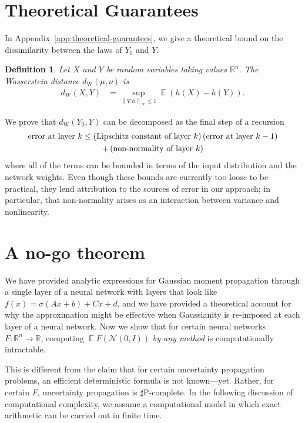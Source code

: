 \documentclass{article}
\newtheorem{definition}{Definition}
\DeclareMathOperator{\expect}{\mathbb{E}}
\begin{document}
\section{Theoretical Guarantees}
In Appendix~\ref{app:theoretical-guarantees}, we give a theoretical bound on the dissimilarity between the laws of \(Y_0\) and \(Y\).

\begin{definition}
Let \(X\) and \(Y\) be random variables taking values  \(\mathbb{R}^n\).
The Wasserstein distance \(d_\text{W} (\mu, \nu)\) is 
\begin{align*}
  d_\mathrm{W}(X, Y) &= \sup_{\left\|\nabla h\right\|_{\infty} \leq 1} \expect (h(X) - h(Y)).
\end{align*}
\end{definition}

We prove that \(d_\mathrm{W}(Y_0, Y)\) can be decomposed as
the final step of a recursion
\begin{multline}
  \text{error at layer \(k\)}
  \leq \del{\text{Lipschitz constant of layer \(k\)}} \del{\text{error at layer \(k-1\)}}
  \\
  + \del{\text{non-normality of layer \(k\)}}
\end{multline}
where all of the terms can be bounded in terms of the input distribution and the network weights.
Even though these bounds are currently too loose to be practical, they lend attribution to the sources of error in our approach; in particular, that non-normality arises as an interaction between variance and nonlinearity.

\section{A no-go theorem}
We have provided analytic expressions for Gaussian moment propagation through a single layer of a neural network with layers that look like \(f(x) = \sigma(A x + b) + C x + d\),
and we have provided a theoretical account for why the approximation might be effective when Gaussianity is re-imposed at each layer of a neural network.
Now we show that for certain neural networks \(F:\mathbb{R}^n \to \mathbb{R}\), computing \(\expect F(\mathcal N(0, I))\) \emph{by any method} is computationally intractable.

This is different from the claim that for certain uncertainty propagation problems, an efficient deterministic formula is not known---yet.
Rather, for certain \(F\), uncertainty propagation is \(\sharp\)P-complete.
In the following discussion of computational complexity, we assume a computational model in which exact arithmetic can be carried out in finite time.
\end{document}
